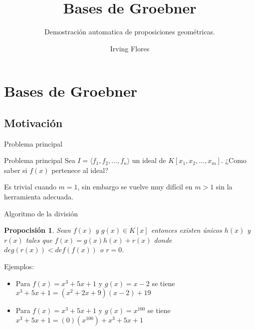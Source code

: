 \documentclass[10pt]{beamer}
\author{Irving Flores}
\institute{Escuela Superior de Física y Matemáticas del IPN}
\title{Bases de Groebner}
\subtitle{Demostración automatica de proposiciones geométricas.}
\newtheorem{prop}{Propocisión}
\newcommand{\gen}[1]{\ensuremath{\langle #1\rangle}}
\begin{document}
\begin{frame}
\titlepage
\end{frame}

\begin{frame}
\tableofcontents
\end{frame}

\section{Bases de Groebner}
\subsection{Motivación}

\begin{frame}{Problema principal}

	\begin{block}{Problema principal}
		Sea $I = \gen{f_1,f_2,\ldots, f_n}$ un ideal de $K[x_1,x_2,\ldots, x_m]$.
		¿Como saber si $f(x)$ pertenece al ideal?
	\end{block}

	\pause
	Es trivial cuando $m=1$, sin embargo se vuelve muy difícil en $m>1$ sin la herramienta adecuada.
\end{frame}


\begin{frame}{Algoritmo de la división}

	\begin{prop}
		Sean $f(x)$ y $g(x)\in K[x]$ entonces existen únicos $h(x)$ y $r(x)$ tales que $f(x) = g(x)h(x)+r(x)$ donde $deg(r(x)) < def(f(x))$ o $r = 0$.
	\end{prop}

	\pause
	Ejemplos:

	\begin{itemize}
		\item Para $f(x)=x^3+5x+1$ y $g(x)=x-2$ se tiene $x^3+5x+1 = (x^2+2x+9)(x-2) + 19$
		\item Para $f(x)=x^3+5x+1$ y $g(x)=x^100$ se tiene $x^3+5x+1 = (0)(x^{100}) + x^3+5x+1$
	\end{itemize}

\end{frame}
\end{document}
